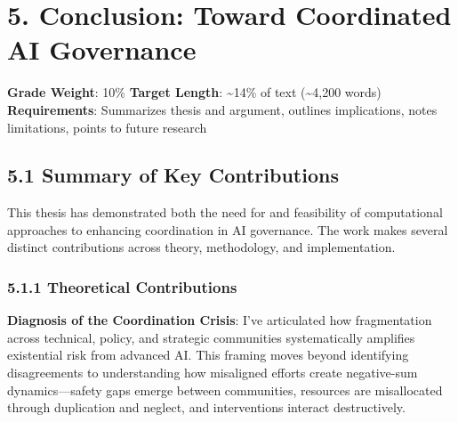 \documentclass[
  11pt,
  letterpaper,
]{book}
\begin{document}
\chapter*{5. Conclusion: Toward Coordinated AI
Governance}\label{sec-conclusion}


\begin{tcolorbox}[enhanced jigsaw, arc=.35mm, titlerule=0mm, breakable, toprule=.15mm, toptitle=1mm, colframe=quarto-callout-note-color-frame, coltitle=black, bottomrule=.15mm, bottomtitle=1mm, opacityback=0, title=\textcolor{quarto-callout-note-color}{\faInfo}\hspace{0.5em}{Chapter Overview}, rightrule=.15mm, leftrule=.75mm, colback=white, colbacktitle=quarto-callout-note-color!10!white, opacitybacktitle=0.6, left=2mm]

\textbf{Grade Weight}: 10\% \textbar{} \textbf{Target Length}:
\textasciitilde14\% of text (\textasciitilde4,200 words)\\
\textbf{Requirements}: Summarizes thesis and argument, outlines
implications, notes limitations, points to future research

\end{tcolorbox}

\section*{5.1 Summary of Key Contributions}\label{sec-key-contributions}


This thesis has demonstrated both the need for and feasibility of
computational approaches to enhancing coordination in AI governance. The
work makes several distinct contributions across theory, methodology,
and implementation.

\subsection*{5.1.1 Theoretical
Contributions}\label{sec-theoretical-contributions}

\textbf{Diagnosis of the Coordination Crisis}: I've articulated how
fragmentation across technical, policy, and strategic communities
systematically amplifies existential risk from advanced AI. This framing
moves beyond identifying disagreements to understanding how misaligned
efforts create negative-sum dynamics---safety gaps emerge between
communities, resources are misallocated through duplication and neglect,
and interventions interact destructively.
\end{document}
